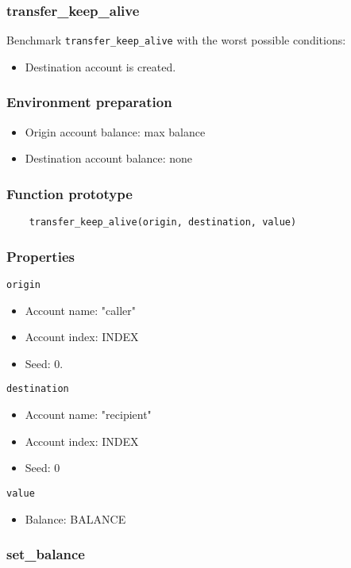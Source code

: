 \documentclass[11pt,a4paper]{article}
\begin{document}
\subsubsection{transfer\_keep\_alive}

Benchmark \verb|transfer_keep_alive| with the worst possible conditions:
\begin{itemize}
\item Destination account is created.
\end{itemize}

\subsubsection*{Environment preparation}
\begin{itemize}
\item Origin account balance: max balance
\item Destination account balance: none
\end{itemize}

\subsubsection*{Function prototype}
\begin{verbatim}
    transfer_keep_alive(origin, destination, value)
\end{verbatim}

\subsubsection*{Properties}
\verb|origin|
\begin{itemize}
\item Account name: "caller"
\item Account index: INDEX
\item Seed: 0.
\end{itemize}
\verb|destination|
\begin{itemize}
\item Account name: "recipient"
\item Account index: INDEX
\item Seed: 0
\end{itemize}
\verb|value|
\begin{itemize}
\item Balance: BALANCE
\end{itemize}

\subsubsection{set\_balance}
\end{document}
